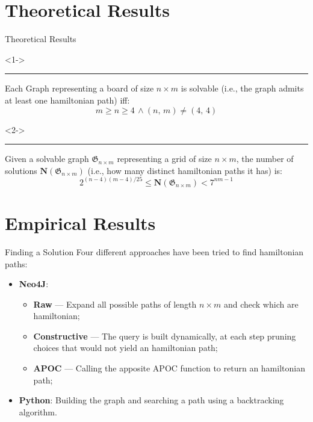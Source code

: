 \documentclass{beamer}
\begin{document}
	\section{Theoretical Results}
	
	\begin{frame}{Theoretical Results}
		\begin{theorem} 
			\rule{\linewidth}{0.4pt}
			Each Graph representing a board of size $n \times m$ is solvable (i.e., the graph admits at least one hamiltonian path) iff:
			$$
				m \ge n \ge 4\, \land (n,\,m) \neq (4,\,4) 
			$$
		\end{theorem}
		\begin{theorem}[Number of Solutions]<2->
			\rule{\linewidth}{0.4pt}
			Given a solvable graph $\mathfrak{G}_{n \times m}$ representing a grid of size $n \times m$, the number of solutions $\textbf{N}(\mathfrak{G}_{n \times m})$ (i.e., how many distinct hamiltonian paths it has) is:
			$$
				2^{(n - 4)(m - 4)/25} \le \mathbf{N}(\mathfrak{G}_{n \times m}) < 7^{nm - 1}
			$$
		\end{theorem}
	\end{frame}
	
	\section{Empirical Results}
	
	\begin{frame}{Finding a Solution}
		Four different approaches have been tried to find hamiltonian paths:
		\begin{itemize}[<+->]
			\item \textbf{Neo4J}:
			\begin{itemize}
				\item \textbf{Raw} --- Expand all possible paths of length $n \times m$ and check which are hamiltonian;
				\item \textbf{Constructive} --- The query is built dynamically, at each step pruning choices that would not yield an hamiltonian path;
				\item \textbf{APOC} --- Calling the apposite APOC function to return an hamiltonian path;
			\end{itemize}
			\item \textbf{Python}: Building the graph and searching a path using a backtracking algorithm.
		\end{itemize}
	\end{frame}
	
\end{document}
